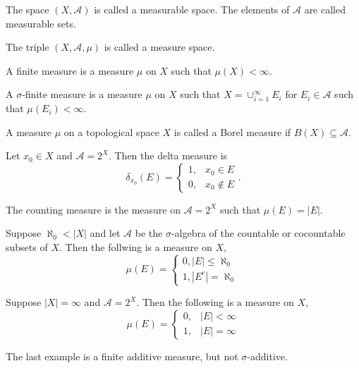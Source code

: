 \documentclass[11pt,a4paper]{article}
\newcommand{\A}{\mathcal A}
\begin{document}
\begin{definition}
  The space $(X,\A)$ is called a measurable space.
  The elements of $\A$ are called measurable sets.
\end{definition}

\begin{definition}
  The triple $(X,\A,\mu)$ is called a measure space.
\end{definition}

\begin{definition}
  A finite measure is a measure $\mu$ on $X$ such that $\mu(X) < \infty$.
\end{definition}

\begin{definition}
  A $\sigma$-finite measure is a measure $\mu$ on $X$ such that
  $X = \cup_{i=1}^{\infty} E_i$ for $E_i \in \A$ such that $\mu(E_i) < \infty$.
\end{definition}

\begin{definition}
  A measure $\mu$ on a topological space $X$ is called a Borel measure
  if $B(X) \subseteq \A$.
\end{definition}

\begin{example}
  Let $x_0 \in X$ and $\A = 2^X$.
  Then the delta measure is
  \[
    \delta_{x_0}(E) =
    \begin{cases}
      1, &x_0 \in E \\
      0, &x_0 \notin E
    \end{cases}.
  \]
\end{example}

\begin{example}
  The counting measure is the measure on $\A = 2^X$ such that
  $\mu(E) = |E|$.
\end{example}

\begin{example}
  Suppose $\aleph_0 < |X|$ and let $\A$ be the $\sigma$-algebra of the countable
  or cocountable subsets of $X$. Then the follwing is a measure on $X$,
  \[
    \mu(E) =
    \begin{cases}
      0, |E| \le \aleph_0 \\
      1, |E^c| = \aleph_0
    \end{cases}
  \]
\end{example}

\begin{example}
  Suppose $|X| = \infty$ and $\A = 2^X$.
  Then the following is a measure on $X$,
  \[
    \mu(E) =
    \begin{cases}
      0, &|E| < \infty \\
      1, &|E| = \infty
    \end{cases}
  \]
\end{example}
\begin{remark}
  The last example is a finite additive measure, but not $\sigma$-additive.
\end{remark}
\end{document}
